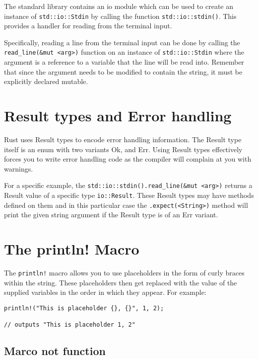 \documentclass[12pt,notitlepage]{article}
\begin{document}
The standard library contains an io module which can be used to create an
instance of \lstinline{std::io::Stdin} by calling the function
\lstinline{std::io::stdin()}. This provides a handler for reading from the
terminal input.

Specifically, reading a line from the terminal input can be done by calling the
\lstinline{read_line(&mut <arg>)} function on an instance of
\lstinline{std::io::Stdin} where the argument is a reference to a variable that
the line will be read into. Remember that since the argument needs to be
modified to contain the string, it must be explicitly declared mutable.

\section{Result types and Error handling}

Rust uses Result types to encode error handling information. The Result type
itself is an enum with two variants Ok, and Err. Using Result types effectively
forces you to write error handling code as the compiler will complain at you
with warnings.

For a specific example, the \lstinline{std::io::stdin().read_line(&mut <arg>)}
returns a Result value of a specific type \lstinline{io::Result}. These Result
types may have methods defined on them and in this particular case the
\lstinline{.expect(<String>)} method will print the given string argument if
the Result type is of an Err variant.

\section{The println! Macro}

The \lstinline{println!} macro allows you to use placeholders in the form of
curly braces within the string. These placeholders then get replaced with the
value of the supplied variables in the order in which they appear. For example:

\begin{lstlisting}
println!("This is placeholder {}, {}", 1, 2);

// outputs "This is placeholder 1, 2"

\end{lstlisting}

\subsection{Marco not function}
\end{document}
